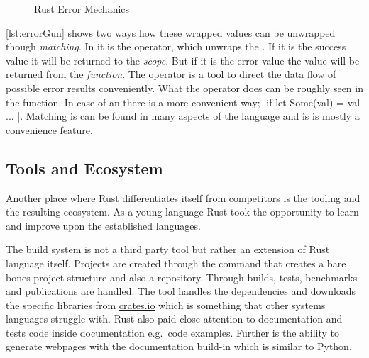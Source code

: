 \documentclass[thesis]{subfiles}
\begin{document}
    \newsavebox{\errorGun}
    \begin{lrbox}{\errorGun}
      \begin{minipage}{.45\linewidth}
        
      \end{minipage}
    \end{lrbox}

    \begin{figure}[ht]
      \captionsetup{type=lstlisting}
       \hfill%
      \caption{Rust Error Mechanics}\label{lst:error}
    \end{figure}

    \autoref{lst:errorGun} shows two ways how these wrapped values can be unwrapped though \emph{matching}.
    In  it is the  operator, which unwraps the .
    If it is the success value it will be returned to the \emph{scope}.
    But if it is the error value the value will be returned from the \emph{function}.
    The  operator is a tool to direct the data flow of possible error results conveniently.
    What the  operator does can be roughly seen in the  function.
    In case of an  there is a more convenient way; \codr|if let Some(val) = val { ... }|.
    Matching is can be found in many aspects of the language and is is mostly a convenience feature.

  \subsection{Tools and Ecosystem}
    Another place where Rust differentiates itself from competitors is the tooling and the resulting ecosystem.
    As a young language Rust took the opportunity to learn and improve upon the established languages.

    The build system is not a third party tool but rather an extension of Rust language itself.
    Projects are created through the  command that creates a bare bones project structure and also a  repository.
    Through  builds, tests, benchmarks and publications are handled.
    The tool handles the dependencies and downloads the specific libraries from \href{www.crates.io}{crates.io} which is something that other systems languages struggle with.
    Rust also paid close attention to documentation and tests code inside documentation e.g.\ code examples.
    Further is the ability to generate webpages with the documentation build-in which is similar to Python.
\end{document}
